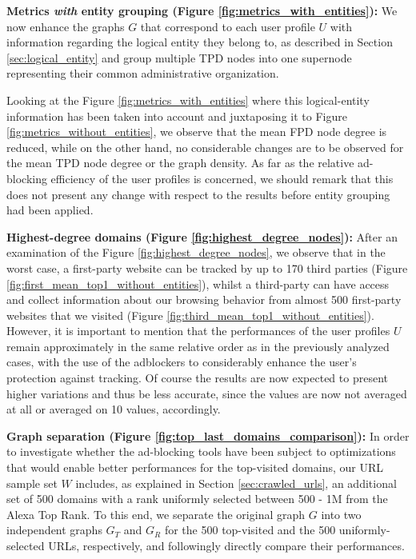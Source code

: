 \documentclass{sig-alternate}
\begin{document}
\textbf{Metrics \textit{with} entity grouping (Figure \ref{fig:metrics_with_entities}):} We now enhance the graphs $G$ that correspond to each user profile $U$ with information regarding the logical entity they belong to, as described in Section \ref{sec:logical_entity} and group multiple TPD nodes into one supernode representing their common administrative organization.

Looking at the Figure \ref{fig:metrics_with_entities} where this logical-entity information has been taken into account and juxtaposing it to Figure \ref{fig:metrics_without_entities}, we observe that the mean FPD node degree is reduced, while on the other hand, no considerable changes are to be observed for the mean TPD node degree or the graph density. As far as the relative ad-blocking efficiency of the user profiles is concerned, we should remark that this does not present any change with respect to the results before entity grouping had been applied.

\textbf{Highest-degree domains (Figure \ref{fig:highest_degree_nodes}):} After an examination of the Figure \ref{fig:highest_degree_nodes}, we observe that in the worst case, a first-party website can be tracked by up to 170 third parties (Figure \ref{fig:first_mean_top1_without_entities}), whilst a third-party can have access and collect information about our browsing behavior from almost 500 first-party websites that we visited (Figure \ref{fig:third_mean_top1_without_entities}). However, it is important to mention that the performances of the user profiles $U$ remain approximately in the same relative order as in the previously analyzed cases, with the use of the adblockers to considerably enhance the user's protection against tracking. Of course the results are now expected to present higher variations and thus be less accurate, since the values are now not averaged at all or averaged on 10 values, accordingly.

\textbf{Graph separation (Figure \ref{fig:top_last_domains_comparison}):} In order to investigate whether the ad-blocking tools have been subject to optimizations that would enable better performances for the top-visited domains, our URL sample set $W$ includes, as explained in Section \ref{sec:crawled_urls}, an additional set of 500 domains with a rank uniformly selected between 500 - 1M from the Alexa Top Rank. To this end, we separate the original graph $G$ into two independent graphs $G_T$ and $G_R$ for the 500 top-visited and the 500 uniformly-selected URLs, respectively, and followingly directly compare their performances.
\end{document}
